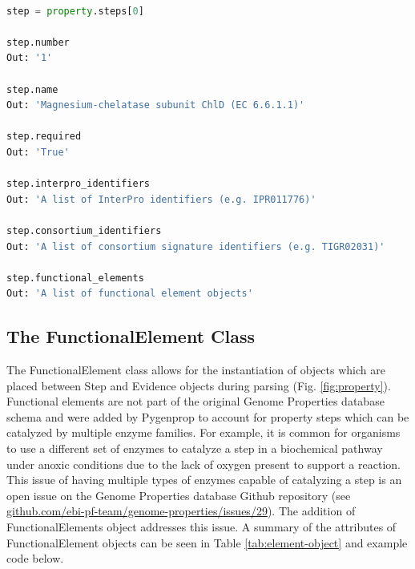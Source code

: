 \begin{lstlisting}[language=Python]

step = property.steps[0]
	
step.number
Out: '1'

step.name
Out: 'Magnesium-chelatase subunit ChlD (EC 6.6.1.1)'

step.required
Out: 'True'

step.interpro_identifiers
Out: 'A list of InterPro identifiers (e.g. IPR011776)'

step.consortium_identifiers 
Out: 'A list of consortium signature identifiers (e.g. TIGR02031)'

step.functional_elements
Out: 'A list of functional element objects'

\end{lstlisting}

\subsection{The FunctionalElement Class}

The FunctionalElement class allows for the instantiation of objects which are placed between Step and Evidence objects during parsing (Fig. \ref{fig:property}). Functional elements are not part of the original Genome Properties database schema and were added by Pygenprop to account for property steps which can be catalyzed by multiple enzyme families. For example, it is common for organisms to use a different set of enzymes to catalyze a step in a biochemical pathway under anoxic conditions due to the lack of oxygen present to support a reaction. This issue of having multiple types of enzymes capable of catalyzing a step is an open issue on the Genome Properties database Github repository (see \href{github.com/ebi-pf-team/genome-properties/issues/29}{github.com/ebi-pf-team/genome-properties/issues/29}). The addition of FunctionalElements object addresses this issue. A summary of the attributes of FunctionalElement objects can be seen in Table \ref{tab:element-object} and example code below.

